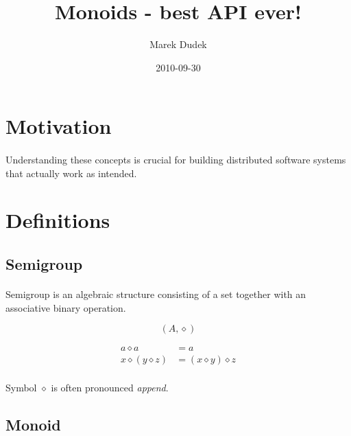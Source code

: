 \documentclass{article}
\title{Monoids - best API ever!}
\date{2010-09-30}
\author{Marek Dudek}
\begin{document}
\maketitle

\newpage
\tableofcontents

\newpage
{}

\section{Motivation}

    \paragraph{}
    Understanding these concepts is crucial for building distributed software systems that actually work as intended.

\section{Definitions}

\subsection{Semigroup}

    \paragraph{}
    Semigroup is an algebraic structure consisting of a set together with an associative binary operation.

    \begin{equation*}
        (A, \diamond)
    \end{equation*}

    \begin{align*}
        a \diamond a &= a \\
        x \diamond (y \diamond z) &= (x \diamond y) \diamond z
    \end{align*}

    \paragraph{}
    Symbol $\diamond$ is often pronounced \textit{append}.

\subsection{Monoid}
\end{document}
